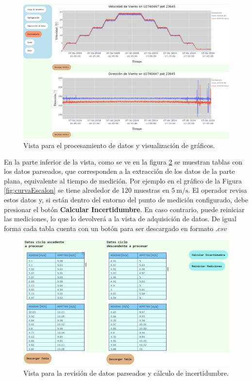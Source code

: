 \begin{figure}[H]
    \centering
    \includegraphics[width=1\linewidth]{Figuras/AplicacionWeb/frontend/procesarDatos1.png}
    \caption{Vista para el procesamiento de datos y visualización de gráficos.}
    \label{fig:procesarDatos1}
\end{figure}

En la parte inferior de la vista, como se ve en la figura \ref{fig:procesarDatos2} se muestran tablas con los datos parseados, que corresponden a la extracción de los datos de la parte plana, equivalente al tiempo de medición. Por ejemplo en el gráfico de la Figura \ref{fig:curvaEscalon} se tiene alrededor de 120 muestras en $\SI{5}{\meter\per\second}$. El operador revisa estos datos y, si están dentro del entorno del punto de medición configurado, debe presionar el botón \textbf{Calcular Incertidumbre}. En caso contrario, puede reiniciar las mediciones, lo que lo devolverá a la vista de adquisición de datos. De igual forma cada tabla cuenta con un botón para ser descargado en formato $.csv$

\begin{figure}[H]
    \centering
    \includegraphics[width=0.9\linewidth]{Figuras/AplicacionWeb/frontend/procesarDatos2.png}
    \caption{Vista para la revisión de datos parseados y cálculo de incertidumbre.}
    \label{fig:procesarDatos2}
\end{figure}



